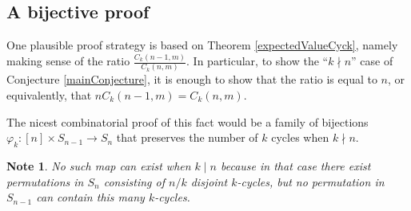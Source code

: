\documentclass{article}
\numberwithin{equation}{subsection}
\newtheorem{note}[theo]{Note}
\begin{document}
\subsection{A bijective proof}
One plausible proof strategy is based on Theorem \ref{expectedValueCyck},
namely making sense of the ratio $\frac{C_k(n-1,m)}{C_k(n,m)}$. In particular,
to show the ``$k \nmid n$'' case of Conjecture \ref{mainConjecture}, it is
enough to show that the ratio is equal to $n$, or equivalently, that
$nC_k(n-1,m) = C_k(n,m)$.

The nicest combinatorial proof of this fact would be a family of bijections
$\varphi_k \colon [n] \times S_{n-1} \rightarrow S_n$ that preserves the
number of $k$ cycles when $k \nmid n$.

\begin{note}
  No such map can exist when $k \mid n$ because in that case there exist
  permutations in $S_n$ consisting of $n/k$ disjoint $k$-cycles, but no
  permutation in $S_{n-1}$ can contain this many $k$-cycles.
\end{note}
\end{document}
